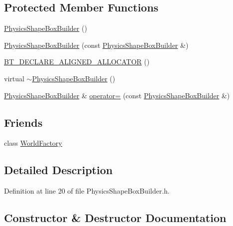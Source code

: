 \subsection*{Protected Member Functions}
\begin{DoxyCompactItemize}
\item 
\mbox{\hyperlink{classnjli_1_1_physics_shape_box_builder_aad1b89364fd342f213ffa722cc014073}{Physics\+Shape\+Box\+Builder}} ()
\item 
\mbox{\hyperlink{classnjli_1_1_physics_shape_box_builder_a66153c085bf838cfcb4587cdae29dc80}{Physics\+Shape\+Box\+Builder}} (const \mbox{\hyperlink{classnjli_1_1_physics_shape_box_builder}{Physics\+Shape\+Box\+Builder}} \&)
\item 
\mbox{\hyperlink{classnjli_1_1_physics_shape_box_builder_a302bcf9a9f1df9753cbc4308e8212409}{B\+T\+\_\+\+D\+E\+C\+L\+A\+R\+E\+\_\+\+A\+L\+I\+G\+N\+E\+D\+\_\+\+A\+L\+L\+O\+C\+A\+T\+OR}} ()
\item 
virtual \mbox{\hyperlink{classnjli_1_1_physics_shape_box_builder_a6f35a485d44ef85b34cbd9332cfa1dec}{$\sim$\+Physics\+Shape\+Box\+Builder}} ()
\item 
\mbox{\hyperlink{classnjli_1_1_physics_shape_box_builder}{Physics\+Shape\+Box\+Builder}} \& \mbox{\hyperlink{classnjli_1_1_physics_shape_box_builder_adc89f620bf76da820746cfb1f5d7df53}{operator=}} (const \mbox{\hyperlink{classnjli_1_1_physics_shape_box_builder}{Physics\+Shape\+Box\+Builder}} \&)
\end{DoxyCompactItemize}
\subsection*{Friends}
\begin{DoxyCompactItemize}
\item 
class \mbox{\hyperlink{classnjli_1_1_physics_shape_box_builder_acb96ebb09abe8f2a37a915a842babfac}{World\+Factory}}
\end{DoxyCompactItemize}


\subsection{Detailed Description}


Definition at line 20 of file Physics\+Shape\+Box\+Builder.\+h.



\subsection{Constructor \& Destructor Documentation}
\mbox{\label{classnjli_1_1_physics_shape_box_builder_aad1b89364fd342f213ffa722cc014073}} 
